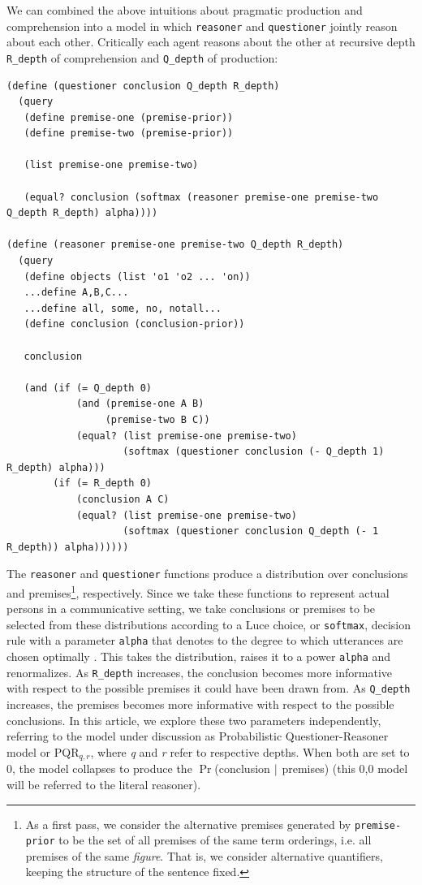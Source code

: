 \documentclass[10pt,letterpaper]{article}
\begin{document}
We can combined the above intuitions about pragmatic production and comprehension into a model in which \lstinline{reasoner} and \lstinline{questioner} jointly reason about each other. Critically each agent reasons about the other at recursive depth \lstinline{R_depth} of comprehension and \lstinline{Q_depth} of production:
\begin{lstlisting}
(define (questioner conclusion Q_depth R_depth)
  (query 
   (define premise-one (premise-prior))
   (define premise-two (premise-prior))
   
   (list premise-one premise-two)
   
   (equal? conclusion (softmax (reasoner premise-one premise-two Q_depth R_depth) alpha))))

(define (reasoner premise-one premise-two Q_depth R_depth)
  (query 
   (define objects (list 'o1 'o2 ... 'on)) 
   ...define A,B,C...
   ...define all, some, no, notall...
   (define conclusion (conclusion-prior))
   
   conclusion
   
   (and (if (= Q_depth 0)
            (and (premise-one A B)
                 (premise-two B C))
            (equal? (list premise-one premise-two) 
                    (softmax (questioner conclusion (- Q_depth 1) R_depth) alpha)))
        (if (= R_depth 0)
            (conclusion A C)
            (equal? (list premise-one premise-two) 
                    (softmax (questioner conclusion Q_depth (- 1 R_depth)) alpha))))))
\end{lstlisting}
The \lstinline{reasoner} and \lstinline{questioner} functions produce a distribution over conclusions and premises\footnote{As a first pass, we consider the alternative premises generated by \lstinline{premise-prior} to be the set of all premises of the same term orderings, i.e. all premises of the same \emph{figure}. That is, we consider alternative quantifiers, keeping the structure of the sentence fixed.}, respectively. Since we take these functions to represent actual persons in a communicative setting, we take conclusions or premises to be selected from these distributions according to a Luce choice, or \lstinline{softmax}, decision rule with a parameter \lstinline{alpha} that denotes to the degree to which utterances are chosen optimally \cite{luce1959}. This takes the distribution, raises it to a power \lstinline{alpha} and renormalizes. As \lstinline{R_depth} increases, the conclusion becomes more informative with respect to the possible premises it could have been drawn from. As \lstinline{Q_depth} increases, the premises becomes more informative with respect to the possible conclusions. In this article, we explore these two parameters independently, referring to the model under discussion as Probabilistic Questioner-Reasoner model or PQR$_{q,r}$, where \emph{q} and \emph{r} refer to respective depths. When both are set to 0, the model collapses to produce the $\Pr$(conclusion $\arrowvert$ premises) (this 0,0 model will be referred to the literal reasoner). 
\end{document}
